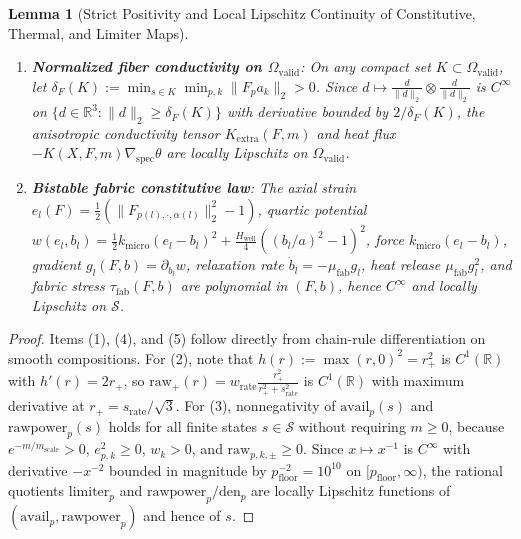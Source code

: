 \documentclass[11pt,a4paper]{article}
\newtheorem{lemma}[theorem]{Lemma}
\theoremstyle{definition}
\begin{document}
\begin{lemma}[Strict Positivity and Local Lipschitz Continuity of Constitutive, Thermal, and Limiter Maps]
\begin{enumerate}
  \begin{equation}
    \mathrm{den}_p(s) := p_{\mathrm{floor}} + \eta\,\mathrm{avail}_p(s) + \mathrm{rawpower}_p(s) \ge p_{\mathrm{floor}} = 10^{-5} > 0 \qquad \forall s \in \mathcal{S}.
  \end{equation}
  Consequently, $\mathrm{limiter}_p(s) = \frac{\eta\,\mathrm{avail}_p(s)}{\mathrm{den}_p(s)} \in [0,1]$, $\dot{m}_{p,k,\pm} = \mathrm{limiter}_p\,\mathrm{raw}_{p,k,\pm}$, and the grid thermal extraction $\mathrm{extraction}$ are locally Lipschitz on $\mathcal{S}$.
  \item \textbf{Normalized fiber conductivity on $\Omega_{\mathrm{valid}}$}: On any compact set $K \subset \Omega_{\mathrm{valid}}$, let $\delta_F(K) := \min_{s \in K} \min_{p,k} \|F_p a_k\|_2 > 0$. Since $d \mapsto \frac{d}{\|d\|_2} \otimes \frac{d}{\|d\|_2}$ is $C^\infty$ on $\{d \in \mathbb{R}^3 : \|d\|_2 \ge \delta_F(K)\}$ with derivative bounded by $2/\delta_F(K)$, the anisotropic conductivity tensor $K_{\mathrm{extra}}(F, m)$ and heat flux $-K(X, F, m)\nabla_{\mathrm{spec}}\theta$ are locally Lipschitz on $\Omega_{\mathrm{valid}}$.
  \item \textbf{Bistable fabric constitutive law}: The axial strain $e_l(F) = \frac{1}{2}(\|F_{p(l),\cdot,\alpha(l)}\|_2^2 - 1)$, quartic potential $w(e_l, b_l) = \frac{1}{2}k_{\mathrm{micro}}(e_l - b_l)^2 + \frac{H_{\mathrm{well}}}{4}((b_l/a)^2 - 1)^2$, force $k_{\mathrm{micro}}(e_l - b_l)$, gradient $g_l(F, b) = \partial_{b_l} w$, relaxation rate $\dot{b}_l = -\mu_{\mathrm{fab}}g_l$, heat release $\mu_{\mathrm{fab}}g_l^2$, and fabric stress $\tau_{\mathrm{fab}}(F, b)$ are polynomial in $(F, b)$, hence $C^\infty$ and locally Lipschitz on $\mathcal{S}$.
\end{enumerate}
\end{lemma}

\begin{proof}
Items (1), (4), and (5) follow directly from chain-rule differentiation on smooth compositions. For (2), note that $h(r) := \max(r, 0)^2 = r_+^2$ is $C^1(\mathbb{R})$ with $h'(r) = 2r_+$, so $\mathrm{raw}_+(r) = w_{\mathrm{rate}}\frac{r_+^2}{r_+^2 + s_{\mathrm{rate}}^2}$ is $C^1(\mathbb{R})$ with maximum derivative at $r_+ = s_{\mathrm{rate}}/\sqrt{3}$. For (3), nonnegativity of $\mathrm{avail}_p(s)$ and $\mathrm{rawpower}_p(s)$ holds for all finite states $s \in \mathcal{S}$ without requiring $m \ge 0$, because $e^{-m/m_{\mathrm{scale}}} > 0$, $e_{p,k}^2 \ge 0$, $w_k > 0$, and $\mathrm{raw}_{p,k,\pm} \ge 0$. Since $x \mapsto x^{-1}$ is $C^\infty$ with derivative $-x^{-2}$ bounded in magnitude by $p_{\mathrm{floor}}^{-2} = 10^{10}$ on $[p_{\mathrm{floor}}, \infty)$, the rational quotients $\mathrm{limiter}_p$ and $\mathrm{rawpower}_p/\mathrm{den}_p$ are locally Lipschitz functions of $(\mathrm{avail}_p, \mathrm{rawpower}_p)$ and hence of $s$.
\end{proof}
\end{document}
